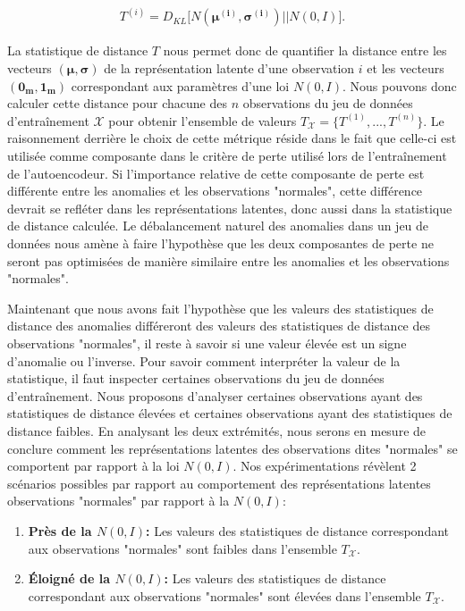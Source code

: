  \begin{gather}  \label{eq:metrique}
 T^{(i)} = D_{KL}\big[N(\boldsymbol{\mu^{(i)}}, \boldsymbol{\sigma^{(i)}}) || N(0, I)\big].
 \end{gather}
 
 La statistique de distance $T$ nous permet donc de quantifier la distance entre les vecteurs $(\boldsymbol{\mu}, \boldsymbol{\sigma})$ de la représentation latente d'une observation $i$ et les vecteurs $(\boldsymbol{0_m}, \boldsymbol{1_m})$ correspondant aux paramètres d'une loi $N(0,I)$. Nous pouvons donc calculer cette distance pour chacune des $n$ observations du jeu de données d'entraînement $\mathcal{X}$ pour obtenir l'ensemble de valeurs $T_{\mathcal{X}}=\{T^{(1)}, ..., T^{(n)}\}$. Le raisonnement derrière le choix de cette métrique réside dans le fait que celle-ci est utilisée comme composante dans le critère de perte utilisé lors de l'entraînement de l'autoencodeur. Si l'importance relative de cette composante de perte est différente entre les anomalies et les observations "normales", cette différence devrait se refléter dans les représentations latentes, donc aussi dans la statistique de distance calculée. Le débalancement naturel des anomalies dans un jeu de données nous amène à faire l'hypothèse que les deux composantes de perte ne seront pas optimisées de manière similaire entre les anomalies et les observations "normales".
 
 Maintenant que nous avons fait l'hypothèse que les valeurs des statistiques de distance des anomalies différeront des valeurs des statistiques de distance des observations "normales", il reste à savoir si une valeur élevée est un signe d'anomalie ou l'inverse. Pour savoir comment interpréter la valeur de la statistique, il faut inspecter certaines observations du jeu de données d'entraînement. Nous proposons d'analyser certaines observations ayant des statistiques de distance élevées et certaines observations ayant des statistiques de distance faibles. En analysant les deux extrémités, nous serons en mesure de conclure comment les représentations latentes des observations dites "normales" se comportent par rapport à la loi $N(0,I)$. Nos expérimentations révèlent 2 scénarios possibles par rapport au comportement des représentations latentes observations "normales" par rapport à la $N(0,I)$:

\begin{enumerate} \label{liste_scenarios}
	\item \textbf{Près de la $N(0,I)$:} Les valeurs des statistiques de distance correspondant aux observations "normales" sont faibles dans l'ensemble $T_{\mathcal{X}}$.
	\item \textbf{Éloigné de la $N(0,I)$:} Les valeurs des statistiques de distance correspondant aux observations "normales" sont élevées dans l'ensemble $T_{\mathcal{X}}$.
\end{enumerate}

